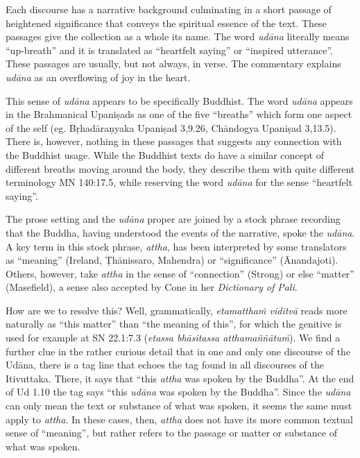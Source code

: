 \documentclass[12pt,openany]{book}%
\begin{document}
Each discourse has a narrative background culminating in a short passage of heightened significance that conveys the spiritual essence of the text. These passages give the collection as a whole its name. The word \textit{\textsanskrit{udāna}} literally means “up-breath” and it is translated as “heartfelt saying” or “inspired utterance”. These passages are usually, but not always, in verse. The commentary explains \textit{\textsanskrit{udāna}} as an overflowing of joy in the heart.

This sense of \textit{\textsanskrit{udāna}} appears to be specifically Buddhist. The word \textit{\textsanskrit{udāna}} appears in the Brahmanical \textsanskrit{Upaniṣads} as one of the five “breaths” which form one aspect of the self (eg. \textsanskrit{Bṛhadāraṇyaka} \textsanskrit{Upaniṣad} 3,9.26, \textsanskrit{Chāndogya} \textsanskrit{Upaniṣad} 3,13.5). There is, however, nothing in these passages that suggests any connection with the Buddhist usage. While the Buddhist texts do have a similar concept of different breaths moving around the body, they describe them with quite different terminology MN 140:17.5, while reserving the word \textit{\textsanskrit{udāna}} for the sense “heartfelt saying”.

The prose setting and the \textit{\textsanskrit{udāna}} proper are joined by a stock phrase recording that the Buddha, having understood the events of the narrative, spoke the \textit{\textsanskrit{udāna}}. A key term in this stock phrase, \textit{attha}, has been interpreted by some translators as “meaning” (Ireland, \textsanskrit{Ṭhānissaro}, Mahendra) or “significance” (Ānandajoti). Others, however, take \textit{attha} in the sense of “connection” (Strong) or else “matter” (Masefield), a sense also accepted by Cone in her \textit{Dictionary of Pali}. 

How are we to resolve this? Well, grammatically, \textit{\textsanskrit{etamatthaṁ} \textsanskrit{viditvā}} reads more naturally as “this matter” than “the meaning of this”, for which the genitive is used for example at SN 22.1:7.3 (\textit{etassa \textsanskrit{bhāsitassa} \textsanskrit{atthamaññātuṁ}}). We find a further clue in the rather curious detail that in one and only one discourse of the \textsanskrit{Udāna}, there is a tag line that echoes the tag found in all discourses of the Itivuttaka. There, it says that “this \textit{attha} was spoken by the Buddha”. At the end of Ud 1.10  the tag says “this \textit{\textsanskrit{udāna}} was spoken by the Buddha”. Since the \textit{\textsanskrit{udāna}} can only mean the text or substance of what was spoken, it seems the same must apply to \textit{attha}. In these cases, then, \textit{attha} does not have its more common textual sense of “meaning”, but rather refers to the passage or matter or substance of what was spoken.
\end{document}
